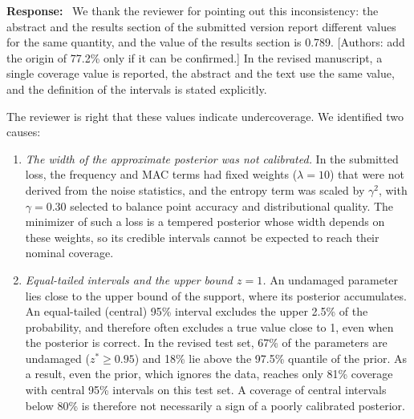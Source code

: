 \documentclass[11pt]{article}
\newenvironment{response}{\par\smallskip\noindent\color{resp}\textbf{Response:}\ }{\par}
\newcommand{\authornote}[1]{\textcolor{note}{\textsf{[Authors: #1]}}}
\begin{document}
\begin{response}
We thank the reviewer for pointing out this inconsistency: the abstract and the results section of the submitted version
report different values for the same quantity, and the value of the results section is 0.789.
\authornote{add the origin of 77.2\% only if it can be confirmed.} In the revised manuscript, a single coverage value is
reported, the abstract and the text use the same value, and the definition of the intervals is stated explicitly.

The reviewer is right that these values indicate undercoverage. We identified two causes:
\begin{enumerate}[leftmargin=*]
\item \emph{The width of the approximate posterior was not calibrated.} In the submitted loss, the frequency and MAC
terms had fixed weights ($\lambda=10$) that were not derived from the noise statistics, and the entropy term was
scaled by $\gamma^2$, with $\gamma=0.30$ selected to balance point accuracy and distributional quality. The minimizer of such a loss is a tempered posterior
whose width depends on these weights, so its credible intervals cannot be expected to reach their nominal coverage.
\item \emph{Equal-tailed intervals and the upper bound $z=1$.} An undamaged parameter lies close to the upper bound of
the support, where its posterior accumulates. An equal-tailed (central) 95\% interval excludes the upper 2.5\% of the
probability, and therefore often excludes a true value close to 1, even when the posterior is correct. In the revised
test set, 67\% of the parameters are undamaged ($z^*\ge0.95$) and 18\% lie above the 97.5\% quantile of the prior. As a
result, even the prior, which ignores the data, reaches only 81\% coverage with central 95\% intervals on this test set.
A coverage of central intervals below 80\% is therefore not necessarily a sign of a poorly calibrated posterior.
\end{enumerate}


\end{response}
\end{document}
